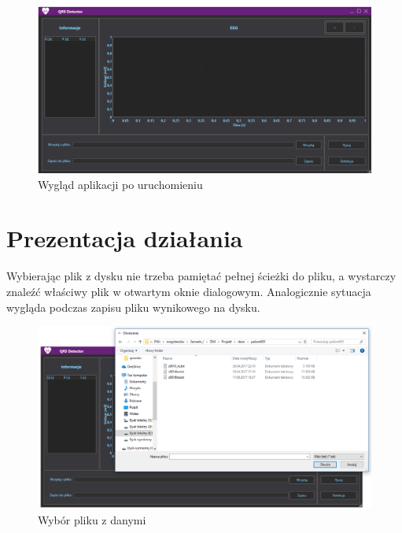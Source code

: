 \documentclass[11pt]{report}
\begin{document}
	\begin{figure} [H]
		\centering
		\includegraphics[width=1\linewidth]{GUI.png}
		\caption{Wygląd aplikacji po uruchomieniu}
		\label{fig:GUI}
	\end{figure}
	\vspace{2cm}

	\chapter{Prezentacja działania}
	Wybierając plik z dysku nie trzeba pamiętać pełnej ścieżki do pliku, a wystarczy znaleźć właściwy plik w otwartym oknie dialogowym. Analogicznie sytuacja wygląda podczas zapisu pliku wynikowego na dysku.
	
	\begin{figure} [H]
		\centering
		\includegraphics[width=1\linewidth]{okno_dialogowe.png}
		\caption{Wybór pliku z danymi}
		\label{fig:okno_dialogowe}
	\end{figure}
	\vspace{2cm}
	
\end{document}
